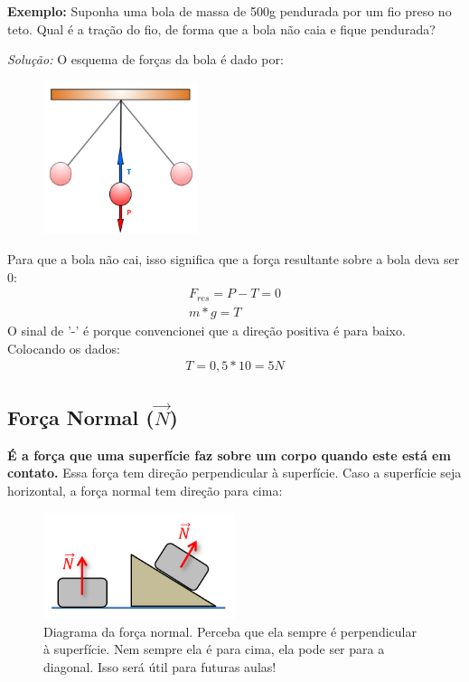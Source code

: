\documentclass[12pt]{extarticle}
\newcommand{\<}{\langle}
\renewcommand{\>}{\rangle}
\theoremstyle{definition}
\begin{document}
\textbf{Exemplo:} Suponha uma bola de massa de 500g pendurada por um fio preso no teto. Qual é a tração do fio, de forma que a bola não caia e fique pendurada?

\textit{Solução:} O esquema de forças da bola é dado por:
\begin{figure}[h]
    \centering
    \includegraphics[width=0.4\textwidth]{tracao-no-pendulo.jpg}
    \label{fig:tracao}
\end{figure}

Para que a bola não cai, isso significa que a força resultante sobre a bola deva ser 0:
\begin{align*}
    F_{res} = P - T = 0\\
    m*g = T
\end{align*}
O sinal de '-' é porque convencionei que a direção positiva é para baixo. Colocando os dados:
\begin{align*}
    T = 0,5 *10 = 5N
\end{align*}

\subsection{Força Normal ($\vec{N}$)}

\textbf{É a força que uma superfície faz sobre um corpo quando este está em contato.} Essa força tem direção perpendicular à superfície. Caso a superfície seja horizontal, a força normal tem direção para cima:
\begin{figure}[h]
    \centering
    \includegraphics[width=0.5\textwidth]{word-image-1.png}
    \caption{Diagrama da força normal. Perceba que ela sempre é perpendicular à superfície. Nem sempre ela é para cima, ela pode ser para a diagonal. Isso será útil para futuras aulas!}
    \label{fig:normal}
\end{figure}
\end{document}
